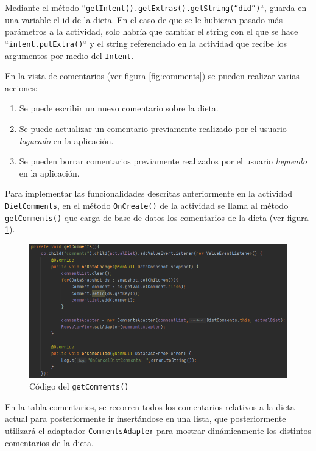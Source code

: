 Mediante el método ``\texttt{getIntent().getExtras().getString(“did”)}``, guarda en una variable el id de la dieta. En el caso de que se le hubieran pasado más parámetros a la actividad, solo habría que cambiar el string con el que se hace ``\texttt{intent.putExtra()}`` y el string referenciado en la actividad que recibe los argumentos por medio del \texttt{Intent}.

En la vista de comentarios (ver figura \ref{fig:comments}) se pueden realizar varias acciones:
\begin{enumerate}
    \item Se puede escribir un nuevo comentario sobre la dieta.
    \item Se puede actualizar un comentario previamente realizado por el usuario \textit{logueado} en la aplicación.
    \item Se pueden borrar comentarios previamente realizados por el usuario \textit{logueado} en la aplicación.
\end{enumerate}

Para implementar las funcionalidades descritas anteriormente en la actividad \texttt{DietComments}, en el método \texttt{OnCreate()} de la actividad se llama al método \texttt{getComments()} que carga de base de datos los comentarios de la dieta (ver figura \ref{fig:getcomments}).

\begin{figure}[H]
    \centering
    \includegraphics[width=\textwidth]{Images/Capitulo7/getcomments.png}
    \caption{Código del \texttt{getComments()}}
    \label{fig:getcomments}
\end{figure}

En la tabla comentarios, se recorren todos los comentarios relativos a la dieta actual para posteriormente ir insertándose en una lista, que posteriormente utilizará el adaptador \texttt{CommentsAdapter} para mostrar dinámicamente los distintos comentarios de la dieta.


